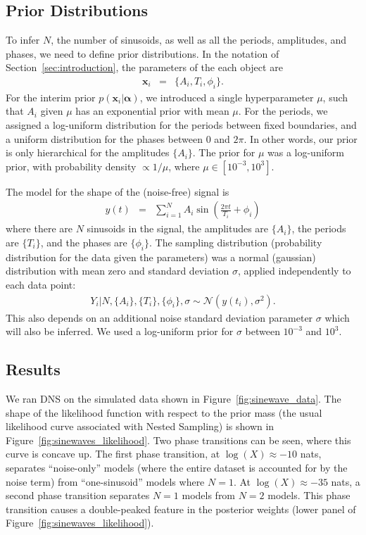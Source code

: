 \documentclass[letterpaper, 11pt]{article}
\newcommand{\hyperparams}{\boldsymbol{\alpha}}
\newcommand{\xx}{\mathbf{x}}
\begin{document}
\subsection{Prior Distributions}
To infer $N$, the number of sinusoids, as well as all the periods, amplitudes,
and phases, we need to define prior distributions.
In the notation of Section~\ref{sec:introduction}, the parameters of the
each object are
\begin{eqnarray}
\xx_i &=& \{A_i, T_i, \phi_i\}.
\end{eqnarray}
For the interim prior $p(\xx_i | \hyperparams)$, we introduced a single
hyperparameter $\mu$, such that $A_i$ given $\mu$ has an exponential prior
with mean $\mu$. For the periods, we assigned a log-uniform distribution for
the periods between fixed boundaries, and a uniform distribution for the phases
between 0 and $2\pi$. In other words, our prior is only hierarchical for the
amplitudes $\{A_i\}$. The prior for $\mu$ was a log-uniform prior, with
probability density $\propto 1/\mu$, where $\mu \in [10^{-3}, 10^3]$.

The model for the shape of the (noise-free) signal is
\begin{eqnarray}
y(t) &=& \sum_{i=1}^N A_i \sin \left(\frac{2\pi t}{T_i} + \phi_i\right)
\end{eqnarray}
where there are $N$ sinusoids in the signal, the
amplitudes are $\{A_i\}$, the periods are $\{T_i\}$, and the phases are
$\{\phi_i\}$.
The sampling distribution (probability distribution for the data given the
parameters) was a normal (gaussian) distribution with mean zero and standard
deviation $\sigma$, applied independently to each data point:
\begin{eqnarray}
Y_i | N, \{A_i\}, \{T_i\}, \{\phi_i\}, \sigma \sim
\mathcal{N}\left(y(t_i), \sigma^2\right).
\end{eqnarray}
This also depends on an additional noise standard deviation parameter $\sigma$
which will also be inferred. We used a log-uniform prior for $\sigma$ between
$10^{-3}$ and $10^{3}$.

\subsection{Results}
We ran DNS on the simulated data shown in Figure~\ref{fig:sinewave_data}.
The shape of the likelihood function with respect to the prior mass (the
usual likelihood curve associated with Nested Sampling) is shown in
Figure~\ref{fig:sinewaves_likelihood}. Two phase transitions can be seen,
where this curve is concave up. The
first phase transition, at $\log(X) \approx -10$ nats,
separates ``noise-only'' models (where the
entire dataset is accounted for by the noise term) from ``one-sinusoid'' models
where $N=1$. At $\log(X) \approx -35$ nats, a second phase transition separates
$N=1$ models from $N=2$ models. This phase transition causes a double-peaked
feature in the posterior weights (lower panel of
Figure~\ref{fig:sinewaves_likelihood}).
\end{document}
